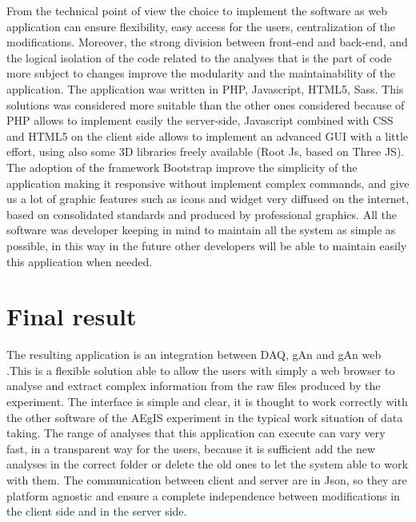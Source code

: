 From the technical point of view the choice to implement the software as web application can ensure flexibility, easy access for the users, centralization of the modifications. Moreover, the strong division between front-end and back-end, and  
the logical isolation of the code related to the analyses that is the part of code more subject to changes improve the modularity and the maintainability of the application.
The application was written in PHP, Javascript, HTML5, Sass. This solutions was considered more suitable than the other ones considered because of PHP allows to implement easily the server-side, Javascript combined with CSS and HTML5 on the client side allows to implement an advanced GUI with a little effort, using also some 3D libraries freely available (Root Js, based on Three JS). The adoption of the framework Bootstrap improve the simplicity of the application making it responsive without implement complex commands, and give us a lot of graphic features such as icons and widget very diffused on the internet, based on consolidated standards and produced by professional graphics. All the software was developer keeping in mind to maintain all the system as simple as possible, in this way in the future other developers will be able to maintain easily this application when needed.

\section{Final result}

The resulting application is an integration between DAQ, gAn and gAn web .This is a flexible solution able to allow the users with simply a web browser to analyse and extract complex information from the raw files produced by the experiment. The interface is simple and clear, it is thought to work correctly with the other software of the AEgIS experiment in the typical work situation of data taking. The range of analyses that this application can execute can vary very fast, in a transparent way for the users, because it is sufficient add the new analyses in the correct folder or delete the old ones to let the system able to work with them. The communication between client and server are in Json, so they are platform agnostic and ensure a complete independence between modifications in the client side and in the server side.

